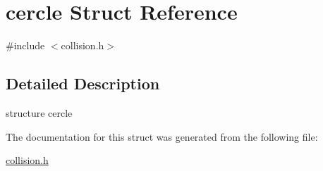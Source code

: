 \hypertarget{structcercle}{}\section{cercle Struct Reference}
\label{structcercle}


{\ttfamily \#include $<$collision.\+h$>$}



\subsection{Detailed Description}
structure cercle 

The documentation for this struct was generated from the following file\+:\begin{DoxyCompactItemize}
\item 
\hyperlink{collision_8h}{collision.\+h}\end{DoxyCompactItemize}
